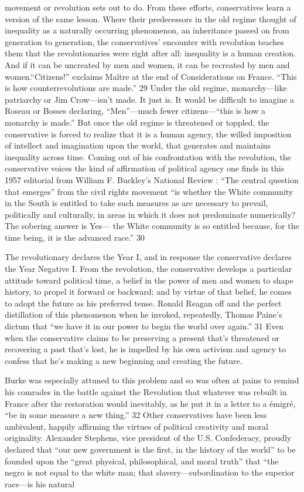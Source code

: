 movement or revolution sets out to do. From these efforts, conservatives learn a version of the same lesson. Where their predecessors in the old regime thought of inequality as a naturally occurring phenomenon, an inheritance passed on from generation to generation, the conservatives’ encounter with revolution teaches them that the revolutionaries were right after all: inequality is a human creation. And if it can be uncreated by men and women, it can be recreated by men and women.“Citizens!” exclaims Maître at the end of Considerations on France. “This is how counterrevolutions are made.” {\color{blue} 29 } Under the old regime, monarchy—like patriarchy or Jim Crow—isn’t made. It just is. It would be difficult to imagine a Roseau or Bosses declaring, “Men”—much fewer citizens—“this is how a monarchy is made.” But once the old regime is threatened or toppled, the conservative is forced to realize that it is a human agency, the willed imposition of intellect and imagination upon the world, that generates and maintains inequality across time. Coming out of his confrontation with the revolution, the conservative voices the kind of affirmation of political agency one finds in this 1957 editorial from William F. Buckley’s National Review : “The central question that emerges” from the civil rights movement “is whether the White community in the South is entitled to take such measures as are necessary to prevail, politically and culturally, in areas in which it does not predominate numerically? The sobering answer is Yes— the White community is so entitled because, for the time being, it is the advanced race.” {\color{blue} 30 } {\par} The revolutionary declares the Year I, and in response the conservative declares the Year Negative I. From the revolution, the conservative develops a particular attitude toward political time, a belief in the power of men and women to shape history, to propel it forward or backward; and by virtue of that belief, he comes to adopt the future as his preferred tense. Ronald Reagan off and the perfect distillation of this phenomenon when he invoked, repeatedly, Thomas Paine’s dictum that “we have it in our power to begin the world over again.” {\color{blue} 31 } Even when the conservative claims to be preserving a present that’s threatened or recovering a past that’s lost, he is impelled by his own activism and agency to confess that he’s making a new beginning and creating the future.{\par} Burke was especially attuned to this problem and so was often at pains to remind his comrades in the battle against the Revolution that whatever was rebuilt in France after the restoration would inevitably, as he put it in a letter to a émigré, “be in some measure a new thing.” {\color{blue} 32 } Other conservatives have been less ambivalent, happily affirming the virtues of political creativity and moral originality. Alexander Stephens, vice president of the U.S. Confederacy, proudly declared that “our new government is the first, in the history of the world” to be founded upon the “great physical, philosophical, and moral truth” that “the negro is not equal to the white man; that slavery—subordination to the superior race—is his natural 